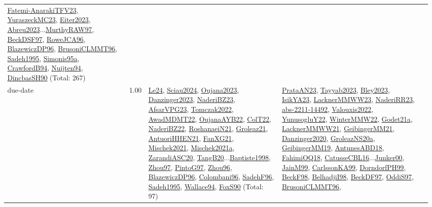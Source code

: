 {\begin{longtable}{p{3cm}r>{\raggedright\arraybackslash}p{6cm}>{\raggedright\arraybackslash}p{6cm}>{\raggedright\arraybackslash}p{8cm}}
\hyperref[detail:Fatemi-AnarakiTFV23]{Fatemi-AnarakiTFV23}, \hyperref[detail:YuraszeckMC23]{YuraszeckMC23}, \hyperref[detail:Eiter2023]{Eiter2023}, \hyperref[detail:Abreu2023]{Abreu2023}...\hyperref[detail:MurthyRAW97]{MurthyRAW97}, \hyperref[detail:BeckDSF97]{BeckDSF97}, \hyperref[detail:RoweJCA96]{RoweJCA96}, \hyperref[detail:BlazewiczDP96]{BlazewiczDP96}, \hyperref[detail:BrusoniCLMMT96]{BrusoniCLMMT96}, \hyperref[detail:Sadeh1995]{Sadeh1995}, \hyperref[detail:Simonis95a]{Simonis95a}, \hyperref[detail:CrawfordB94]{CrawfordB94}, \hyperref[detail:Nuijten94]{Nuijten94}, \hyperref[detail:DincbasSH90]{DincbasSH90} (Total: 267)\\
\index{due-date}\index{Concepts!due-date}due-date &  1.00 & \hyperref[detail:Le24]{Le24}, \hyperref[detail:Sciau2024]{Sciau2024}, \hyperref[detail:Oujana2023]{Oujana2023}, \hyperref[detail:Danzinger2023]{Danzinger2023}, \hyperref[detail:NaderiBZ23]{NaderiBZ23}, \hyperref[detail:AfsarVPG23]{AfsarVPG23}, \hyperref[detail:Tomczak2022]{Tomczak2022}, \hyperref[detail:AwadMDMT22]{AwadMDMT22}, \hyperref[detail:OujanaAYB22]{OujanaAYB22}, \hyperref[detail:ColT22]{ColT22}, \hyperref[detail:NaderiBZ22]{NaderiBZ22}, \hyperref[detail:RoshanaeiN21]{RoshanaeiN21}, \hyperref[detail:Groleaz21]{Groleaz21}, \hyperref[detail:AntuoriHHEN21]{AntuoriHHEN21}, \hyperref[detail:FanXG21]{FanXG21}, \hyperref[detail:Mischek2021]{Mischek2021}, \hyperref[detail:Mischek2021a]{Mischek2021a}, \hyperref[detail:ZarandiASC20]{ZarandiASC20}, \hyperref[detail:TangB20]{TangB20}...\hyperref[detail:Baptiste1998]{Baptiste1998}, \hyperref[detail:Zhou97]{Zhou97}, \hyperref[detail:PintoG97]{PintoG97}, \hyperref[detail:Zhou96]{Zhou96}, \hyperref[detail:BlazewiczDP96]{BlazewiczDP96}, \hyperref[detail:Colombani96]{Colombani96}, \hyperref[detail:SadehF96]{SadehF96}, \hyperref[detail:Sadeh1995]{Sadeh1995}, \hyperref[detail:Wallace94]{Wallace94}, \hyperref[detail:FoxS90]{FoxS90} (Total: 97) & \hyperref[detail:PrataAN23]{PrataAN23}, \hyperref[detail:Tayyab2023]{Tayyab2023}, \hyperref[detail:Bley2023]{Bley2023}, \hyperref[detail:IsikYA23]{IsikYA23}, \hyperref[detail:LacknerMMWW23]{LacknerMMWW23}, \hyperref[detail:NaderiRR23]{NaderiRR23}, \hyperref[detail:abs-2211-14492]{abs-2211-14492}, \hyperref[detail:Valouxis2022]{Valouxis2022}, \hyperref[detail:YunusogluY22]{YunusogluY22}, \hyperref[detail:WinterMMW22]{WinterMMW22}, \hyperref[detail:Godet21a]{Godet21a}, \hyperref[detail:LacknerMMWW21]{LacknerMMWW21}, \hyperref[detail:GeibingerMM21]{GeibingerMM21}, \hyperref[detail:Danzinger2020]{Danzinger2020}, \hyperref[detail:GroleazNS20a]{GroleazNS20a}, \hyperref[detail:GeibingerMM19]{GeibingerMM19}, \hyperref[detail:AntunesABD18]{AntunesABD18}, \hyperref[detail:FahimiOQ18]{FahimiOQ18}, \hyperref[detail:CatusseCBL16]{CatusseCBL16}...\hyperref[detail:Junker00]{Junker00}, \hyperref[detail:JainM99]{JainM99}, \hyperref[detail:CarlssonKA99]{CarlssonKA99}, \hyperref[detail:DorndorfPH99]{DorndorfPH99}, \hyperref[detail:BeckF98]{BeckF98}, \hyperref[detail:BelhadjiI98]{BelhadjiI98}, \hyperref[detail:BeckDF97]{BeckDF97}, \hyperref[detail:OddiS97]{OddiS97}, \hyperref[detail:BrusoniCLMMT96]{BrusoniCLMMT96}, 
\end{longtable}}
